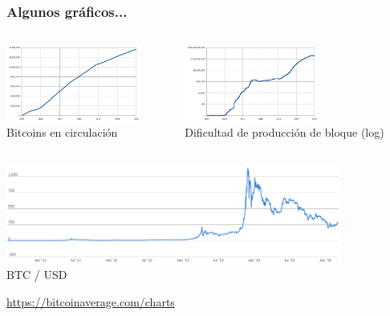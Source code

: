 \begin{frame}
\frametitle{Algunos gráficos...}

\begin{center}
\begin{columns}[T]
\begin{column}{.43\textwidth}
\includegraphics[height=2.5cm]{figs/bitcoin-total-evolution} \\
Bitcoins en circulación \\
\end{column}%
\hfill%
\begin{column}{.54\textwidth}
\includegraphics[height=2.5cm]{figs/bitcoin-difficulty} \\
Dificultad de producción de bloque (log) \\
\end{column}%
\end{columns}
\includegraphics[width=11cm]{figs/bitcoin-usd-evolution} \\
BTC / USD \\
\end{center}
\begin{flushright}
\url{https://bitcoinaverage.com/charts}
\end{flushright}

\end{frame}

